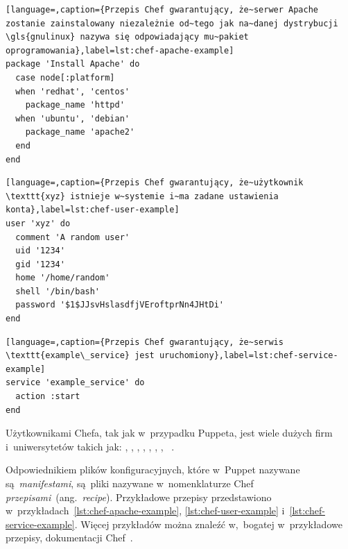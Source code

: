 \documentclass[thesis]{subfiles}
\begin{document}
\begin{lstlisting}[language=,caption={Przepis Chef gwarantujący, że~serwer Apache zostanie zainstalowany niezależnie od~tego jak na~danej dystrybucji \gls{gnulinux} nazywa się odpowiadający mu~pakiet oprogramowania},label=lst:chef-apache-example]
package 'Install Apache' do
  case node[:platform]
  when 'redhat', 'centos'
    package_name 'httpd'
  when 'ubuntu', 'debian'
    package_name 'apache2'
  end
end
\end{lstlisting}

\begin{lstlisting}[language=,caption={Przepis Chef gwarantujący, że~użytkownik \texttt{xyz} istnieje w~systemie i~ma zadane ustawienia konta},label=lst:chef-user-example]
user 'xyz' do
  comment 'A random user'
  uid '1234'
  gid '1234'
  home '/home/random'
  shell '/bin/bash'
  password '$1$JJsvHslasdfjVEroftprNn4JHtDi'
end
\end{lstlisting}

\begin{lstlisting}[language=,caption={Przepis Chef gwarantujący, że~serwis \texttt{example\_service} jest uruchomiony},label=lst:chef-service-example]
service 'example_service' do
  action :start
end
\end{lstlisting}

Użytkownikami Chefa, tak jak w~przypadku Puppeta, jest wiele dużych firm i~uniwersytetów takich jak: , , , \emph{\facebook{}}, , , , ~\cite{chef-customers,puppet-chef-disney}.

Odpowiednikiem plików konfiguracyjnych, które w~Puppet nazywane są~\emph{manifestami}, są~pliki nazywane w~nomenklaturze Chef \emph{przepisami}~(ang.~\emph{recipe}). Przykładowe przepisy przedstawiono w~przykładach~\ref{lst:chef-apache-example}, \ref{lst:chef-user-example} i~\ref{lst:chef-service-example}. Więcej przykładów można znaleźć w,~bogatej w~przykładowe przepisy, dokumentacji Chef~\cite{chef-examples}.

\end{document}
